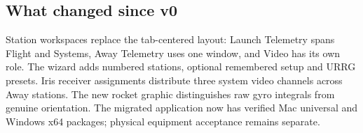 

\subsection*{What changed since v0}
Station workspaces replace the tab-centered layout: Launch Telemetry spans
Flight and Systems, Away Telemetry uses one window, and Video has its own role.
The wizard adds numbered stations, optional remembered setup and URRG presets.
Iris receiver assignments distribute three system video channels across Away
stations. The new rocket graphic distinguishes raw gyro integrals from genuine
orientation. The migrated application now has verified Mac universal and
Windows x64 packages; physical equipment acceptance remains separate.
